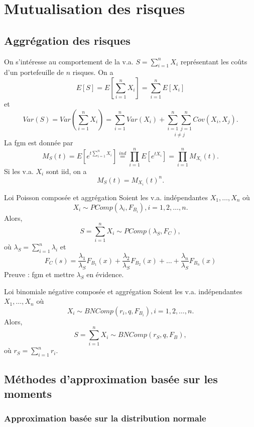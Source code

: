 \chapter{Mutualisation des risques}

\section{Aggrégation des risques}

On s'intéresse au comportement de la v.a. $S = \sum_{i = 1}^{n}X_i$ représentant les coûts  d'un portefeuille de $n$ risques. On a 
$$E[S] = E\left[\sum_{i = 1}^{n} X_i\right] = \sum_{i = 1}^{n}E[X_i]$$
et
$$Var(S) = Var\left(\sum_{i = 1}^{n}X_i\right) = \sum_{i = 1}^{n} Var(X_i) + \underset{i \neq j}{\sum_{i = 1}^{n}\sum_{j = 1}^{n}}Cov(X_i, X_j).$$
La fgm est donnée par 
$$M_S(t) = E\left[e^{t\sum_{i = 1}^{n}X_i}\right] \stackrel{ind}{=} \prod_{i = 1}^{n} E\left[e^{tX_i}\right] = \prod_{i = 1}^{n}M_{X_i}(t).$$
Si les v.a. $X_i$ sont iid, on a 
$$M_S(t) = M_{X_i}(t)^n.$$ 

\begin{proposition}{Loi Poisson composée et aggrégation}{}
	Soient les v.a. indépendantes $X_1, \dots, X_n$ où
	$$X_i \sim PComp(\lambda_i, F_{B_i}), i = 1, 2, \dots, n.$$
	Alors, 
	$$S = \sum_{i = 1}^{n} X_i \sim PComp(\lambda_S, F_{C}),$$
	où $\lambda_S = \sum_{i = 1}^{n}\lambda_i$ et 
	$$F_{C}(s) = \frac{\lambda_1}{\lambda_S}F_{B_1}(x) + \frac{\lambda_2}{\lambda_S}F_{B_2}(x) + \dots + \frac{\lambda_n}{\lambda_S}F_{B_n}(x)$$
	\tcblower
	Preuve : fgm et mettre $\lambda_S$ en évidence. 
\end{proposition}

\begin{proposition}{Loi binomiale négative composée et aggrégation}{}
	Soient les v.a. indépendantes $X_1, \dots, X_n$ où
	$$X_i \sim BNComp(r_i, q, F_{B_i}), i = 1, 2, \dots, n.$$
	Alors, 
	$$S = \sum_{i = 1}^{n} X_i \sim BNComp(r_S, q, F_{B}),$$
	où $r_S = \sum_{i = 1}^{n}r_i$.
\end{proposition}

\section{Méthodes d'approximation basée sur les moments}

\subsection{Approximation basée sur la distribution normale}

